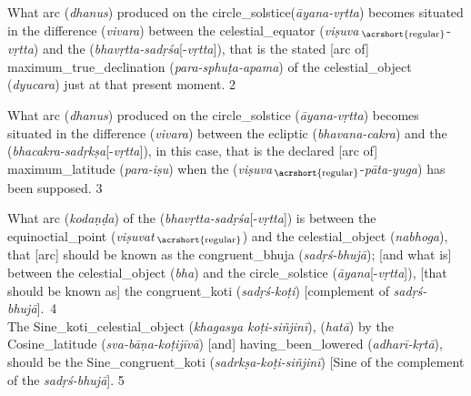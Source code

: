 \noindent\reversemarginpar{}%
What \gls{arc} (\textit{dhanus}) produced on the \gls{circle_solstice}(\textit{āyana-vṛtta}) becomes situated in the  \gls{difference} (\textit{vivara}) between the \gls{celestial_equator} (\textit{viṣuva}\,$_\text{\acrshort{regular}}$-\textit{vṛtta}) and the  (\textit{bhavṛtta-sadṛśa}[-\textit{vṛtta}]), that is the stated [arc of] \gls{maximum_true_declination} (\textit{para-sphuṭa-apama}) of the \gls{celestial_object} (\textit{dyucara}) just at that present moment. 2 
\medskip

\noindent\reversemarginpar{}%
What \gls{arc} (\textit{dhanus}) produced on the \gls{circle_solstice} (\textit{āyana-vṛtta}) becomes situated in the \gls{difference} (\textit{vivara}) between the \gls{ecliptic} (\textit{bhavana-cakra}) and the  (\textit{bhacakra-sadṛkṣa}[-\textit{vṛtta}]), in this case, that is the declared [arc of] \gls{maximum_latitude} (\textit{para-iṣu}) when the  (\textit{viṣuva}\,$_\text{\acrshort{regular}}$-\textit{pāta-yuga}) has been supposed. 3 
\medskip

\noindent\reversemarginpar{}%
What \gls{arc} (\textit{kodaṇḍa}) of the   (\textit{bhavṛtta-sadṛśa}[-\textit{vṛtta}]) is between the \gls{equinoctial_point} (\textit{viṣuvat}\,$_\text{\acrshort{regular}}$) and the \gls{celestial_object} (\textit{nabhoga}), that [arc] should be known as the \gls{congruent_bhuja} (\textit{sadṛś-bhujā}); [and what is] between the \gls{celestial_object} (\textit{bha}) and the \gls{circle_solstice} (\textit{āyana}[-\textit{vṛtta}]), [that should be known as] the \gls{congruent_koti} (\textit{sadṛś-koṭi}) [\ie complement of \textit{sadṛś-bhujā}].~4
\\[.65\baselineskip]

\noindent\reversemarginpar{}%
The \gls{Sine_koti_celestial_object} (\textit{khagasya koṭi-siñjinī}),  (\textit{hatā}) by the \gls{Cosine_latitude} (\textit{sva-bāṇa-koṭijīvā}) [and] \gls{having_been_lowered} (\textit{adharī-kṛtā}), should be the \gls{Sine_congruent_koti} (\textit{sadrkṣa-koṭi-siñjinī}) [\ie Sine of the complement of the \textit{sadṛś-bhujā}]. 5 
\medskip

